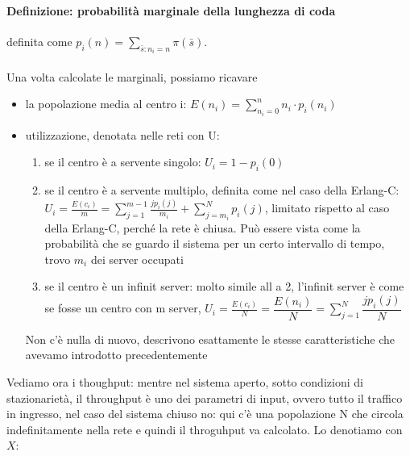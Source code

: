 \documentclass{article}
\begin{document}
\paragraph{Definizione: probabilità marginale della lunghezza di coda}definita come $p_i(n) = \sum\limits_{\bar{s}:n_i = n} \pi(\bar{s})$.\\\\ Una volta calcolate le marginali, possiamo ricavare 
\begin{itemize}
\item la popolazione media al centro i: $E(n_i) = \sum\limits_{n_i=0}^{n} n_i\cdot p_i(n_i)$
\item utilizzazione, denotata nelle reti con U:
\begin{enumerate}
\item se il centro è a servente singolo: $U_i = 1 - p_i(0)$
\item se il centro è a servente multiplo, definita come nel caso della Erlang-C: $U_i = \frac{E(c_i)}{m} = \sum\limits_{j=1}^{m-1} \frac{jp_i(j)}{m_i} + \sum\limits_{j=m_i}^{N} p_i(j)$, limitato rispetto al caso della Erlang-C, perché la rete è chiusa. Può essere vista come la probabilità che se guardo il sistema per un certo intervallo di tempo, trovo $m_i$ dei server occupati 
\item se il centro è un infinit server: molto simile all a 2, l'infinit server è come se fosse un centro con m server, $U_i = \frac{E(c_i)}{N} = \dfrac{E(n_i)}{N} = \sum\limits_{j=1}^{N} \dfrac{jp_i(j)}{N}$
\end{enumerate}
Non c'è nulla di nuovo, descrivono esattamente le stesse caratteristiche che avevamo introdotto precedentemente
\end{itemize}
Vediamo ora i thoughput: mentre nel sistema aperto, sotto condizioni di stazionarietà, il throughput è uno dei parametri di input, ovvero tutto il traffico in ingresso, nel caso del sistema chiuso no: qui c'è una popolazione N che circola indefinitamente nella rete e quindi il throguhput va calcolato. Lo denotiamo con $X$:
\end{document}
